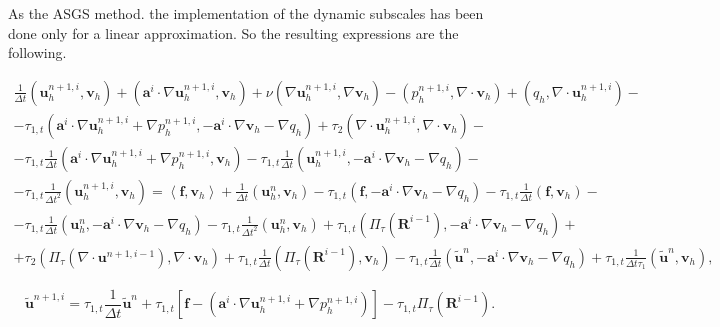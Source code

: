 As the ASGS method. the implementation of the dynamic subscales has been done only for a linear approximation. So the resulting expressions are the following.

\begin{eqnarray}
\label{16}
\frac{1}{\Delta t}(\mathbf{u}_h^{n+1,i},\mathbf{v}_h)+(\mathbf{a}^i\cdot\nabla\mathbf{u}_h^{n+1,i},\mathbf{v}_h)+\nu(\nabla\mathbf{u}_h^{n+1,i},\nabla\mathbf{v}_h)-(p_h^{n+1,i},\nabla\cdot\mathbf{v}_h)+(q_h,\nabla\cdot\mathbf{u}_h^{n+1,i})-\\\nonumber
-\tau_{1,t}(\mathbf{a}^i\cdot\nabla\mathbf{u}_h^{n+1,i}+\nabla p_h^{n+1,i},-\mathbf{a}^i\cdot\nabla\mathbf{v}_h-\nabla q_h)+\tau_2(\nabla\cdot\mathbf{u}_h^{n+1,i},\nabla\cdot\mathbf{v}_h)-\\\nonumber
-\tau_{1,t}\frac{1}{\Delta t}(\mathbf{a}^i\cdot\nabla\mathbf{u}_h^{n+1,i}+\nabla p_h^{n+1,i},\mathbf{v}_h)-\tau_{1,t}\frac{1}{\Delta t}(\mathbf{u}_h^{n+1,i},-\mathbf{a}^i\cdot\nabla\mathbf{v}_h-\nabla q_h)-\\\nonumber
-\tau_{1,t}\frac{1}{\Delta t^2}(\mathbf{u}_h^{n+1,i},\mathbf{v}_h)=\left<\mathbf{f},\mathbf{v}_h\right>+\frac{1}{\Delta t}(\mathbf{u}_h^n,\mathbf{v}_h)-\tau_{1,t}(\mathbf{f},-\mathbf{a}^i\cdot\nabla\mathbf{v}_h-\nabla q_h)-\tau_{1,t}\frac{1}{\Delta t}(\mathbf{f},\mathbf{v}_h)-\\\nonumber
-\tau_{1,t}\frac{1}{\Delta t}(\mathbf{u}_h^n,-\mathbf{a}^i\cdot\nabla\mathbf{v}_h-\nabla q_h)-\tau_{1,t}\frac{1}{\Delta t^2}(\mathbf{u}_h^n,\mathbf{v}_h)+\tau_{1,t}(\Pi_\tau(\mathbf{R}^{i-1}),-\mathbf{a}^i\cdot\nabla\mathbf{v}_h-\nabla q_h)+\\\nonumber
+\tau_2(\Pi_\tau(\nabla\cdot\mathbf{u}^{n+1,i-1}),\nabla\cdot\mathbf{v}_h)+\tau_{1,t}\frac{1}{\Delta t}(\Pi_\tau(\mathbf{R}^{i-1}),\mathbf{v}_h)-\tau_{1,t}\frac{1}{\Delta t}(\tilde{\mathbf{u}}^n,-\mathbf{a}^i\cdot\nabla\mathbf{v}_h-\nabla q_h)+\tau_{1,t}\frac{1}{\Delta t\tau_1}(\tilde{\mathbf{u}}^n,\mathbf{v}_h),
\end{eqnarray}

\begin{equation}
\label{17}
\tilde{\mathbf{u}}^{n+1,i}=\tau_{1,t}\frac{1}{\Delta t}\tilde{\mathbf{u}}^n+\tau_{1,t}\left[\mathbf{f}-(\mathbf{a}^i\cdot\nabla\mathbf{u}_h^{n+1,i}+\nabla p_h^{n+1,i})\right]-\tau_{1,t}\Pi_\tau(\mathbf{R}^{i-1}).
\end{equation}


